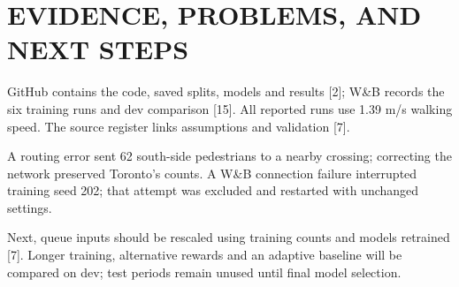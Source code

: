 \documentclass[conference]{IEEEtran}
\begin{document}
\section{EVIDENCE, PROBLEMS, AND NEXT STEPS}
GitHub contains the code, saved splits, models and results [2]; W\&B records the six training runs and dev comparison [15]. All reported runs use 1.39 m/s walking speed. The source register links assumptions and validation [7].

A routing error sent 62 south-side pedestrians to a nearby crossing; correcting the network preserved Toronto's counts. A W\&B connection failure interrupted training seed 202; that attempt was excluded and restarted with unchanged settings.

Next, queue inputs should be rescaled using training counts and models retrained [7]. Longer training, alternative rewards and an adaptive baseline will be compared on dev; test periods remain unused until final model selection.
\end{document}
